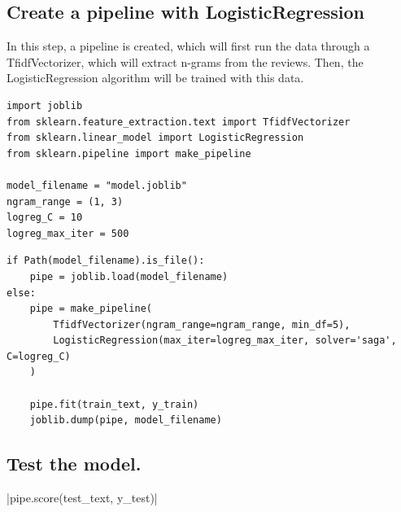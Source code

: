 \documentclass[a4paper,12pt]{article}
\begin{document}
\subsection{Create a pipeline with LogisticRegression}

In this step, a pipeline is created, which will first run the data through a TfidfVectorizer, which will extract n-grams from the reviews.
Then, the LogisticRegression algorithm will be trained with this data.

\begin{verbatim}
import joblib
from sklearn.feature_extraction.text import TfidfVectorizer
from sklearn.linear_model import LogisticRegression
from sklearn.pipeline import make_pipeline

model_filename = "model.joblib"
ngram_range = (1, 3)
logreg_C = 10
logreg_max_iter = 500
\end{verbatim}

\begin{verbatim}
if Path(model_filename).is_file():
    pipe = joblib.load(model_filename)
else:
    pipe = make_pipeline(
        TfidfVectorizer(ngram_range=ngram_range, min_df=5),
        LogisticRegression(max_iter=logreg_max_iter, solver='saga', C=logreg_C)
    )

    pipe.fit(train_text, y_train)
    joblib.dump(pipe, model_filename)

\end{verbatim}

\subsection{Test the model.}

|pipe.score(test_text, y_test)|
\end{document}
